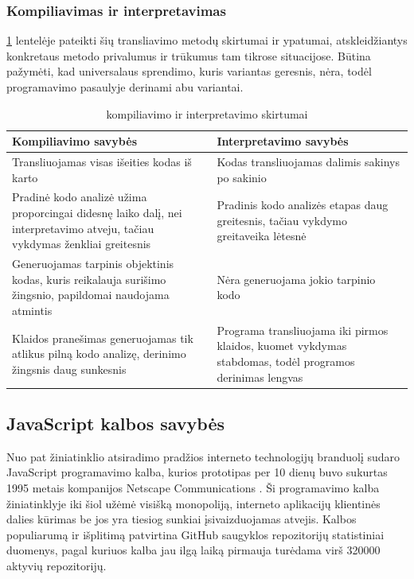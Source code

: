 \documentclass{VUMIFPSkursinis}
\begin{document}
\subsubsection{Kompiliavimas ir interpretavimas}
\ref{tab:kompiliavimas_interpretavimas} lentelėje pateikti šių transliavimo metodų skirtumai ir ypatumai, atskleidžiantys konkretaus metodo privalumus ir trūkumus tam tikrose situacijose. Būtina pažymėti, kad universalaus sprendimo, kuris variantas geresnis, nėra, todėl programavimo pasaulyje derinami abu variantai.

\begin{table}[H]
  \centering
  \caption{kompiliavimo ir interpretavimo skirtumai \cite{PRO19}}
  {\begin{tabular}{|m{13em}|m{13em}|} \hline
     Kompiliavimo savybės & Interpretavimo savybės \\
    \hline
    Transliuojamas visas išeities kodas iš karto & Kodas transliuojamas dalimis 
 sakinys po sakinio \\
 \hline
 Pradinė kodo analizė 
     užima proporcingai didesnę laiko dalį, nei interpretavimo atveju, 
     tačiau vykdymas ženkliai greitesnis &
     Pradinis kodo analizės etapas daug greitesnis, 
     tačiau vykdymo greitaveika lėtesnė   \\
    \hline
     Generuojamas tarpinis objektinis kodas, kuris
 reikalauja surišimo žingsnio, papildomai naudojama atmintis & Nėra generuojama jokio tarpinio kodo \\
 \hline
 Klaidos pranešimas 
 generuojamas tik atlikus pilną kodo analizę, derinimo žingsnis daug sunkesnis &
 Programa transliuojama iki pirmos klaidos, kuomet 
 vykdymas stabdomas, todėl programos derinimas lengvas  \\
 \hline
  \end{tabular}}
  \label{tab:kompiliavimas_interpretavimas}
\end{table}

\subsection{JavaScript kalbos savybės}

Nuo pat žiniatinklio atsiradimo pradžios interneto technologijų branduolį sudaro JavaScript programavimo kalba, kurios prototipas per 10 dienų buvo sukurtas 1995 metais kompanijos Netscape Communications \cite{Ast15}. Ši programavimo kalba žiniatinklyje iki šiol užėmė visišką monopoliją, interneto aplikacijų klientinės dalies kūrimas be jos yra tiesiog sunkiai įsivaizduojamas atvejis. Kalbos populiarumą ir išplitimą patvirtina GitHub saugyklos repozitorijų statistiniai duomenys, pagal kuriuos kalba jau ilgą laiką pirmauja turėdama virš 320000 aktyvių repozitorijų. \cite{GIT19}
\end{document}
